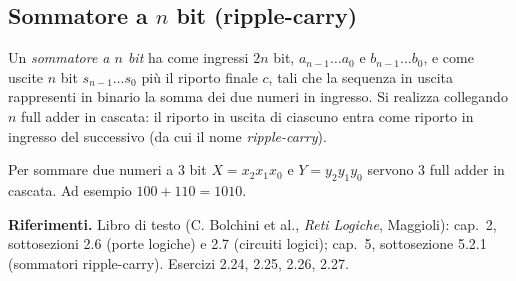 \documentclass[11pt,a4paper]{article}
\begin{document}
\subsection{Sommatore a $n$ bit (ripple-carry)}

Un \emph{sommatore a $n$ bit} ha come ingressi $2n$ bit, $a_{n-1} \dots a_0$ e $b_{n-1} \dots b_0$, e come uscite $n$ bit $s_{n-1} \dots s_0$ più il riporto finale $c$, tali che la sequenza in uscita rappresenti in binario la somma dei due numeri in ingresso. Si realizza collegando $n$ full adder in cascata: il riporto in uscita di ciascuno entra come riporto in ingresso del successivo (da cui il nome \emph{ripple-carry}).

\begin{esempio}
Per sommare due numeri a $3$ bit $X = x_2 x_1 x_0$ e $Y = y_2 y_1 y_0$ servono $3$ full adder in cascata. Ad esempio $100 + 110 = 1010$.
\end{esempio}

\medskip
\noindent\textbf{Riferimenti.} Libro di testo (C. Bolchini et al., \emph{Reti Logiche}, Maggioli): cap.\ 2, sottosezioni 2.6 (porte logiche) e 2.7 (circuiti logici); cap.\ 5, sottosezione 5.2.1 (sommatori ripple-carry). Esercizi 2.24, 2.25, 2.26, 2.27.
\end{document}
